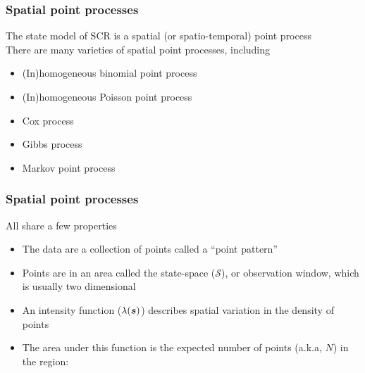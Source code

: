 \documentclass[color=usenames,dvipsnames]{beamer}\usepackage[]{graphicx}\usepackage[]{xcolor}
\begin{document}
\begin{frame}
  \frametitle{Spatial point processes}
  {\centering \large
    The state model of SCR is a spatial (or spatio-temporal) point process \\}
  \vfill
  \pause
  There are many varieties of spatial point processes, including \\
  \begin{itemize}
    \item (In)homogeneous binomial point process
    \item (In)homogeneous Poisson point process
    \item Cox process
    \item Gibbs process
    \item Markov point process
  \end{itemize}
\end{frame}





\begin{frame}
  \frametitle{Spatial point processes}
  All share a few properties \\
  \begin{itemize}%
    \item<1-> The data are a collection of points called a ``point pattern''
    \item<2-> Points are in an area called the state-space
      ($\mathcal{S}$), or observation window, which is usually two
      dimensional  
    \item<3-> An intensity function ($\lambda({\bm s})$) describes spatial
      variation in the density of points
    \item<4-> The area under this function is the expected number of
      points (a.k.a, $N$) in the region:
  \end{itemize}
  \vfill
\end{frame}
\end{document}
